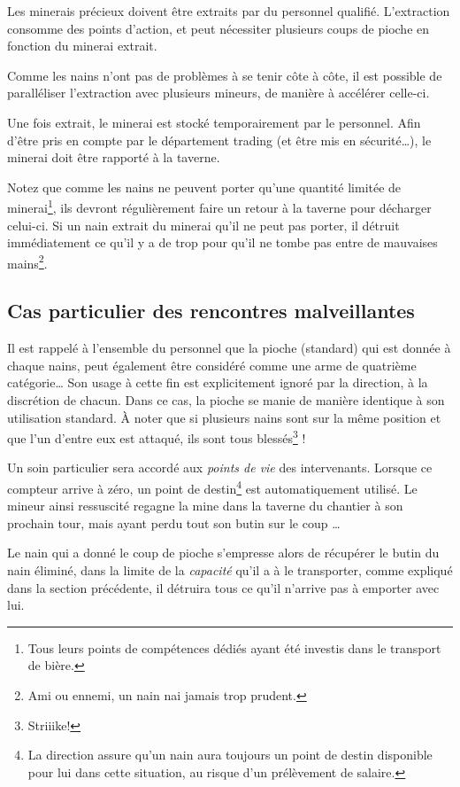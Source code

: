   Les minerais précieux doivent être extraits par du personnel qualifié.
  L'extraction consomme des points d'action, et peut nécessiter plusieurs coups
  de pioche en fonction du minerai extrait.

  Comme les nains n'ont pas de problèmes à se tenir côte à côte, il est
  possible de paralléliser l'extraction avec plusieurs mineurs, de manière à
  accélérer celle-ci.

  Une fois extrait, le minerai est stocké temporairement par le personnel. Afin
  d'être pris en compte par le département trading (et être mis en
  sécurité\ldots{}), le minerai doit être rapporté à la taverne.

  Notez que comme les nains ne peuvent porter qu'une quantité limitée de
  minerai\footnote{Tous leurs points de compétences dédiés ayant été investis
  dans le transport de bière.}, ils devront régulièrement faire un retour à la
  taverne pour décharger celui-ci. Si un nain extrait du minerai qu'il ne peut
  pas porter, il détruit immédiatement ce qu'il y a de trop pour qu'il ne tombe
  pas entre de mauvaises mains\footnote{Ami ou ennemi, un nain nai jamais trop
  prudent.}.

\subsection{Cas particulier des rencontres malveillantes}

  Il est rappelé à l'ensemble du personnel que la pioche (standard) qui est
  donnée à chaque nains, peut également être considéré comme une arme de
  quatrième catégorie\ldots{} Son usage à cette fin est explicitement ignoré par
  la direction, à la discrétion de chacun. Dans ce cas, la pioche se manie de
  manière identique à son utilisation standard. À noter que si plusieurs nains
  sont sur la même position et que l'un d'entre eux est attaqué, ils sont tous
  blessés\footnote{Striiike!} !

  Un soin particulier sera accordé aux \textit{points de vie} des intervenants.
  Lorsque ce compteur arrive à zéro, un point de destin\footnote{La direction
  assure qu'un nain aura toujours un point de destin disponible pour lui dans
  cette situation, au risque d'un prélèvement de salaire.} est automatiquement
  utilisé. Le mineur ainsi ressuscité regagne la mine dans la taverne du
  chantier à son prochain tour, mais ayant perdu tout son butin sur le coup
  \ldots{}

  Le nain qui a donné le coup de pioche s'empresse alors de récupérer le butin
  du nain éliminé, dans la limite de la \textit{capacité} qu'il a à le
  transporter, comme expliqué dans la section précédente, il détruira tous ce
  qu'il n'arrive pas à emporter avec lui.
